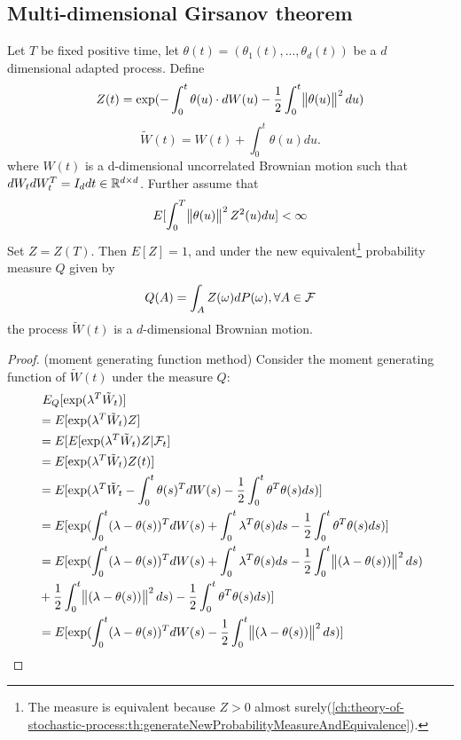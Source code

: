 \begin{refsection}
\subsection{Multi-dimensional Girsanov theorem}
\begin{theorem}\cite[224]{shreve2004stochastic2}\label{ch:theory-of-stochastic-process:th:Girsanovtheoremmultipledimension}\cite[37]{wu2009interest}
	Let $T$ be fixed positive time, let $\theta(t) = (\theta_1(t),...,\theta_d(t))$ be a $d$ dimensional adapted process. Define
	$$Z(t) = \exp(-\int_0^t \theta(u)\cdot dW(u) - \frac{1}{2} \int_0^t \norm{\theta(u)}^2 du)$$
	$$\tilde{W}(t) = W(t) + \int_0^t \theta(u)du.$$
	where $W(t)$ is a d-dimensional uncorrelated Brownian motion such that $dW_tdW_t^T = I_d dt\in \mathbb{R}^{d\times d}$.
	Further assume that 
	$$E[\int_{0}^T \norm{\theta(u)}^2Z^2(u)du] < \infty$$
	Set $Z = Z(T)$. Then $E[Z] = 1$, and under the new equivalent\footnote{The measure is equivalent because $Z > 0$ almost surely(\autoref{ch:theory-of-stochastic-process:th:generateNewProbabilityMeasureAndEquivalence}).} probability measure $Q$ given by
	$$Q(A) = \int_A Z(\omega)dP(\omega), \forall A\in \mathcal{F}$$
	the process $\tilde{W}(t)$ is a $d$-dimensional Brownian motion.	
\end{theorem}
\begin{proof}
	(moment generating function method)
	Consider the moment generating function of $\tilde{W}(t)$ under the measure $Q$:
	\begin{align*}
	& ~E_Q[\exp(\lambda^T\tilde{W}_t)] \\
	& = E[\exp(\lambda^T \tilde{W}_t)Z] \\
	&=E[E[\exp(\lambda^T\tilde{W}_t)Z|\cF_t] \\
	&=E[\exp(\lambda^T\tilde{W}_t)Z(t)] \\
	&=E[\exp(\lambda^T\tilde{W}_t  -\int_0^t \theta(s)^TdW(s) - \frac{1}{2}\int_0^t \theta^T\theta(s)ds)]\\
	&=E[\exp(\int_0^t (\lambda-\theta(s))^TdW(s) +\int_0^t \lambda^T\theta(s)ds - \frac{1}{2}\int_0^t \theta^T\theta(s)ds)]\\
	&=E[\exp(\int_0^t (\lambda-\theta(s))^TdW(s) +\int_0^t \lambda^T\theta(s)ds - \frac{1}{2}\int_0^t \norm{(\lambda-\theta(s))}^2ds) \\
	&+ \frac{1}{2}\int_0^t \norm{(\lambda-\theta(s))}^2ds)- \frac{1}{2}\int_0^t \theta^T
	\theta(s)ds)]\\
	&=E[\exp(\int_0^t (\lambda-\theta(s))^TdW(s) - \frac{1}{2}\int_0^t \norm{(\lambda-\theta(s))}^2ds)]\\

\end{align*}
\end{proof}
\end{refsection}
